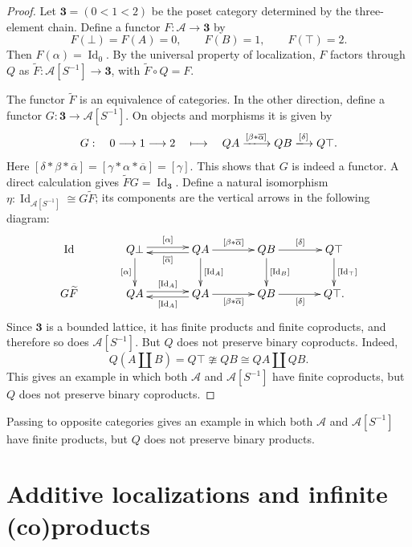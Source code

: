\documentclass[10pt,a4paper]{amsart}
\theoremstyle{plain}
\theoremstyle{definition}
\theoremstyle{remark}
\begin{document}
\begin{proof}
  Let $\mathbf 3=(0<1<2)$ be the poset category determined by the three-element chain.
  Define a functor $F:\mathcal A\longrightarrow\mathbf 3$ by
  \[
    F(\bot)=F(A)=0,
    \qquad F(B)=1,
    \qquad F(\top)=2.
  \]
  Then $F(\alpha)=\operatorname{Id}_0$.
  By the universal property of localization, $F$ factors through $Q$ as $\widetilde F:\mathcal A[S^{-1}]\longrightarrow\mathbf 3$, with $\widetilde F\circ Q=F$.

  \medskip

  The functor $\widetilde F$ is an equivalence of categories.
  In the other direction, define a functor $G:\mathbf 3\longrightarrow \mathcal A[S^{-1}]$.
  On objects and morphisms it is given by
  \[
    G : \quad 0 \longrightarrow 1 \longrightarrow 2 \quad \longmapsto \quad
    QA \xlongrightarrow{[\beta \ast \overline \alpha]} QB \xlongrightarrow{[\delta]} Q\top.
  \]
  Here $[\delta\ast\beta\ast\overline\alpha] = [\gamma\ast\alpha\ast\overline\alpha]= [\gamma]$.
  This shows that $G$ is indeed a functor.
  A direct calculation gives $\widetilde FG=\operatorname{Id}_{\mathbf 3}$.
  Define a natural isomorphism $\eta:\operatorname{Id}_{\mathcal A[S^{-1}]}\cong G\widetilde F$; its components are the vertical arrows in the following diagram:
  \[
    \xymatrix@C=13mm@R=8mm{
    \operatorname{Id}&
    Q\bot\ar@<.55ex>[r]^{[\alpha]}\ar[d]_{[\alpha]}&
    QA\ar@<.55ex>[l]^{[\overline\alpha]}
    \ar[r]^{[\beta\ast\overline\alpha]}
    \ar[d]^{[\operatorname{Id}_A]}&
    QB\ar[r]^{[\delta]}\ar[d]^{[\operatorname{Id}_B]}&
    Q\top\ar[d]^{[\operatorname{Id}_{\top}]}\\
    G\widetilde F&
    QA\ar@<.55ex>[r]^{[\operatorname{Id}_A]}&
    QA\ar@<.55ex>[l]^{[\operatorname{Id}_A]}
    \ar[r]_{[\beta\ast\overline\alpha]}&
    QB\ar[r]_{[\delta]}&
    Q\top.
    }
  \]
  Since $\mathbf 3$ is a bounded lattice, it has finite products and finite coproducts, and therefore so does $\mathcal{A}[S^{-1}]$.
  But $Q$ does not preserve binary coproducts.
  Indeed,
  \[
    Q (A \coprod B) = Q \top \ncong QB \cong QA \coprod QB.
  \]
  This gives an example in which both $\mathcal{A}$ and $\mathcal{A}[S^{-1}]$ have finite coproducts, but $Q$ does not preserve binary coproducts.
\end{proof}

Passing to opposite categories gives an example in which both $\mathcal{A}$ and $\mathcal{A}[S^{-1}]$ have finite products, but $Q$ does not preserve binary products.

\section{Additive localizations and infinite (co)products}\label{sec:additive-infinite-counterexamples}
\end{document}
